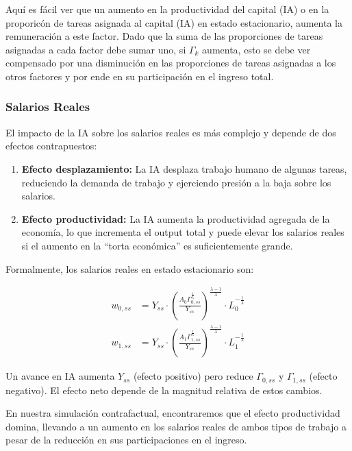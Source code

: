 \documentclass{article}
\theoremstyle{remark}
\theoremstyle{definition}
\begin{document}
Aqu\'i es f\'acil ver que un aumento en la productividad del capital (IA) o en la proporic\'on de tareas asignada al capital (IA) en estado estacionario, aumenta la remuneraci\'on a este factor. Dado que la suma de las proporciones de tareas asignadas a cada factor debe sumar uno, si $\Gamma_k$ aumenta, esto se debe ver compensado por una disminuci\'on en las proporciones de tareas asignadas a los otros factores y por ende en su participaci\'on en el ingreso total.

\subsubsection{Salarios Reales}

El impacto de la IA sobre los salarios reales es más complejo y depende de dos efectos contrapuestos:

\begin{enumerate}
    \item \textbf{Efecto desplazamiento:} La IA desplaza trabajo humano de algunas tareas, reduciendo la demanda de trabajo y ejerciendo presión a la baja sobre los salarios.
    
    \item \textbf{Efecto productividad:} La IA aumenta la productividad agregada de la economía, lo que incrementa el output total y puede elevar los salarios reales si el aumento en la ``torta económica'' es suficientemente grande.
\end{enumerate}

Formalmente, los salarios reales en estado estacionario son:

\begin{align*}
    w_{0,ss} &= Y_{ss} \cdot \left( \frac{A_0 \Gamma_{0,ss}^{\frac{1}{\lambda}}}{Y_{ss}} \right)^{\frac{\lambda-1}{\lambda}} \cdot L_0^{-\frac{1}{\lambda}} \\
    w_{1,ss} &= Y_{ss} \cdot \left( \frac{A_1 \Gamma_{1,ss}^{\frac{1}{\lambda}}}{Y_{ss}} \right)^{\frac{\lambda-1}{\lambda}} \cdot L_1^{-\frac{1}{\lambda}}
\end{align*}

Un avance en IA aumenta $Y_{ss}$ (efecto positivo) pero reduce $\Gamma_{0,ss}$ y $\Gamma_{1,ss}$ (efecto negativo). El efecto neto depende de la magnitud relativa de estos cambios. 

En nuestra simulación contrafactual, encontraremos que el efecto productividad domina, llevando a un aumento en los salarios reales de ambos tipos de trabajo a pesar de la reducción en sus participaciones en el ingreso.
\end{document}
